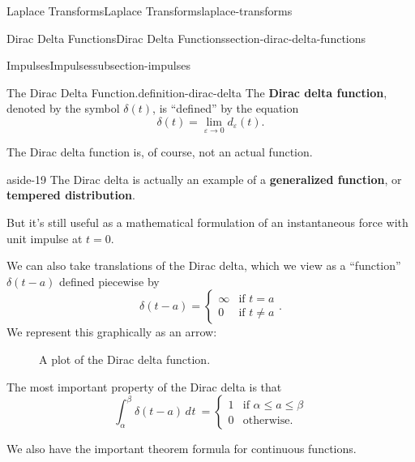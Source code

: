 \documentclass[oneside,10pt,]{book}
\newcommand{\terminology}[1]{\textbf{#1}}
\numberwithin{equation}{section}
\newcommand{\Int}[2]{\int_{#1}^{#2}}
\newcommand{\limit}[2]{\lim_{#1\to#2}}
\newcommand{\dd}[2][]{\, d^{#1} #2\ }
\newcommand{\amp}{&}
\begin{document}
\begin{chapterptx}{Laplace Transforms}{}{Laplace Transforms}{}{}{laplace-transforms}
\begin{sectionptx}{Dirac Delta Functions}{}{Dirac Delta Functions}{}{}{section-dirac-delta-functions}
\begin{subsectionptx}{Impulses}{}{Impulses}{}{}{subsection-impulses}
\begin{definition}{The Dirac Delta Function.}{definition-dirac-delta}%
\hypertarget{p-534}{}%
The \terminology{Dirac delta function}, denoted by the symbol \(\delta(t)\), is ``defined'' by the equation%
\begin{equation*}
\delta(t) = \limit{\varepsilon}{0}d_{\varepsilon}(t).
\end{equation*}
%
\end{definition}
\hypertarget{p-535}{}%
The Dirac delta function is, of course, not an actual function. \begin{aside}{}{aside-19}%
\hypertarget{p-536}{}%
The Dirac delta is actually an example of a \terminology{generalized function}, or \terminology{tempered distribution}.%
\end{aside}
 But it's still useful as a mathematical formulation of an instantaneous force with unit impulse at \(t=0\).%
\par
\hypertarget{p-537}{}%
We can also take translations of the Dirac delta, which we view as a ``function'' \(\delta(t-a)\) defined piecewise by%
\begin{equation*}
\delta(t-a)=
\begin{cases}
\infty \amp\text{if }t=a\\
0 \amp\text{if }t\neq a
\end{cases}.
\end{equation*}
We represent this graphically as an arrow: \begin{figure}
\centering
{
}
\caption{A plot of the Dirac delta function.\label{figure-19}}
\end{figure}
%
\par
\hypertarget{p-538}{}%
The most important property of the Dirac delta is that%
\begin{equation*}
\Int{\alpha}{\beta}\delta(t-a)\dd{t} = 
\begin{cases}
1 \amp\text{if }\alpha\leq a\leq\beta \\
0 \amp\text{otherwise.}  
\end{cases}
\end{equation*}
%
\par
\hypertarget{p-539}{}%
We also have the important theorem formula for continuous functions.%

\end{subsectionptx}
\end{sectionptx}
\end{chapterptx}
\end{document}
